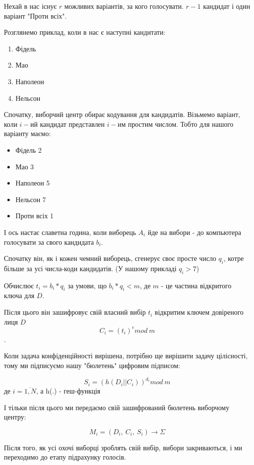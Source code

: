 \documentclass[12pt]{report}
\theoremstyle{plain}
\theoremstyle{definition}
\theoremstyle{remark}
\begin{document}
Нехай в нас існує $r$ можливих варіантів, за кого голосувати. $r-1$ кандидат і один варіант "Проти всіх".

Розглянемо приклад, коли в нас є наступні кандитати:

\begin{enumerate}
    \item Фідель
    \item Мао
    \item Наполеон
    \item Нельсон
\end{enumerate}

Спочатку, виборчий центр обирає кодування для кандидатів. Візьмемо варіант, коли $i-ий$ кандидат
представлен $i-им$ простим числом. Тобто для нашого варіанту маємо:

\begin{itemize}
    \item Фідель 2
    \item Мао 3
    \item Наполеон 5
    \item Нельсон 7
    \item Проти всіх 1
\end{itemize}

І ось настає славетна година, коли виборець $A_i$ йде на вибори -
до компьютера голосувати за свого кандидата $b_i$. 

Спочатку він, як і кожен чемний виборець, сгенерує своє просте число $q_i$, котре більше за 
усі числа-коди кандидатів. (У нашому прикладі $q_i>7$)

Обчислює $t_i=b_i*q_i$ за умови, що $b_i*q_i<m$, де $m$ - це частина відкритого ключа для $D$.

Після цього він зашифровує свій власний вибір $t_i$ відкритим ключем довіреного лиця $D$
\[ C_i = (t_i)^e mod\ m \].

Коли задача конфіденційності вирішена, потрібно ще вирішити задачу цілісності, тому ми підписуємо 
нашу "бюлетень" цифровим підписом:

\[ S_i = (h(D_i || C_i))^{d_i} mod \ m \] 
де $i = \overline{1,N}$, а h(.) - геш-функція

І тільки після цього ми передаємо свій зашифрований бюлетень виборчому центру:

\[ M_i = (D_i,\ C_i,\ S_i) \rightarrow \Sigma\]  

Після того, як усі охочі виборці зроблять свій вибір, вибори закриваються, і ми переходимо до етапу 
підрахунку голосів.
\end{document}
